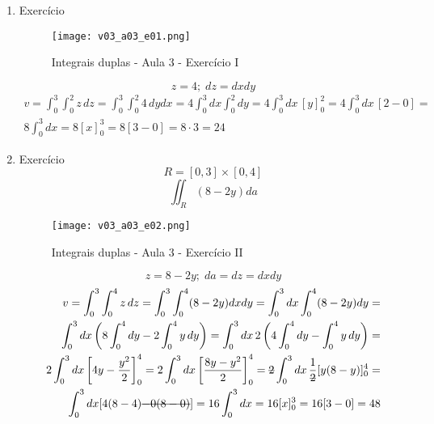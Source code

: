 \begin{enumerate}
	\item Exercício
	
	\begin{figure}[htb]
		\caption{Integrais duplas - Aula 3 - Exercício I}
		\label{v03_a03_e01}
		\centering
		\texttt{[image: v03\_a03\_e01.png]}		
	\end{figure}
	
	\begin{equation*}
		z = 4;\; dz = dx dy	
	\end{equation*}	
	\begin{align*}
		v = \int_0^3 \int_0^2 z\, dz = \int_0^3 \int_0^2 4\, dy dx = 4\int_0^3 dx \int_0^2 dy = 4\int_0^3 dx\, [y]_0^2 = 4\int_0^3 dx\, [2 - 0] =\\ 8\int_0^3 dx = 8[x]_0^3 = 8[3 - 0] = 8 \cdot 3 = 24
	\end{align*}
		
	\item Exercício
	\begin{equation*}
		R = [0, 3] \times [0,4]
	\end{equation*}
	\begin{equation*}
		\iint_R (8 - 2y) da
	\end{equation*}
	
	\begin{figure}[htb]
		\caption{Integrais duplas - Aula 3 - Exercício II}
		\label{v03_a03_e02}
		\centering
		\texttt{[image: v03\_a03\_e02.png]}		
	\end{figure}	
	
	\begin{equation*}
		z = 8 - 2y;\; da = dz = dx dy
	\end{equation*}
	\begin{align*}
		v = \int_0^3 \int_0^4 z\,dz = \int_0^3 \int_0^4(8 - 2y)dx dy = \int_0^3 dx \int_0^4(8 - 2y) dy =\\ \int_0^3 dx \left(8\int_0^4 dy - 2\int_0^4 y\,dy\right) = \int_0^3 dx\, 2\left(4\int_0^4 dy - \int_0^4 y\,dy\right) =\\ 2\int_0^3 dx \left[4y - \dfrac{y^2}{2}\right]_0^4 = 2\int_0^3 dx \left[\dfrac{8y - y^2}{2}\right]_0^4 = \overstrike{2}\int_0^3 dx\, \dfrac{1}{\overstrike{2}}[y(8 - y)]_0^4 =\\ \int_0^3 dx[4(8 - 4) \overstrike{- 0(8 - 0)}] = 16\int_0^3 dx = 16[x]_0^3 = 16[3 - 0] = 48
	\end{align*}
\end{enumerate}